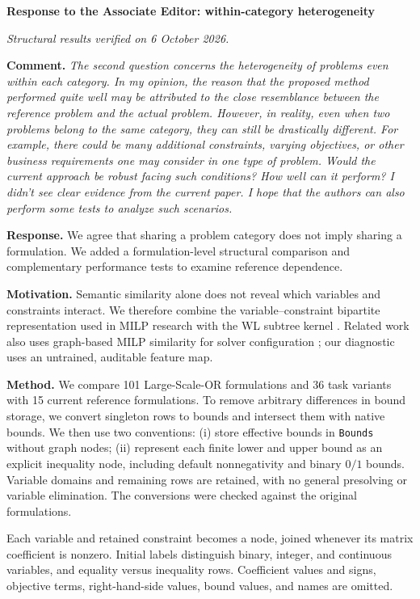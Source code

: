 \documentclass[10pt]{article}
\begin{document}
\textbf{\large Response to the Associate Editor: within-category heterogeneity}

\textit{Structural results verified on 6 October 2026.}

\textbf{Comment.} \textit{The second question concerns the heterogeneity of
problems even within each category. In my opinion, the reason that the
proposed method performed quite well may be attributed to the close
resemblance between the reference problem and the actual problem. However,
in reality, even when two problems belong to the same category, they can
still be drastically different. For example, there could be many additional
constraints, varying objectives, or other business requirements one may
consider in one type of problem. Would the current approach be robust
facing such conditions? How well can it perform? I didn't see clear evidence
from the current paper. I hope that the authors can also perform some tests
to analyze such scenarios.}

\begingroup\color{replyblue}
\textbf{Response.} We agree that sharing a problem category does not imply
sharing a formulation. We added a formulation-level structural comparison
and complementary performance tests to examine reference dependence.

\medskip
\textbf{Motivation.}
Semantic similarity alone does not reveal which variables and constraints
interact. We therefore combine the variable--constraint bipartite
representation used in MILP research \citep{Gasse2019} with the WL subtree
kernel \citep{Shervashidze2011}. Related work also uses graph-based MILP
similarity for solver configuration \citep{Hosny2024}; our diagnostic uses
an untrained, auditable feature map.

\medskip
\textbf{Method.}
We compare 101 Large-Scale-OR formulations and 36 task variants with
15 current reference formulations. To remove arbitrary differences in
bound storage, we convert singleton rows to bounds and intersect them
with native bounds. We then use two conventions: (i) store effective
bounds in \texttt{Bounds} without graph nodes; (ii) represent each finite
lower and upper bound as an explicit inequality node, including default
nonnegativity and binary $0/1$ bounds. Variable domains and remaining
rows are retained, with no general presolving or variable elimination.
The conversions were checked against the original formulations.

Each variable and retained constraint becomes a node, joined whenever
its matrix coefficient is nonzero. Initial labels distinguish binary,
integer, and continuous variables, and equality versus inequality rows.
Coefficient values and signs, objective terms, right-hand-side values,
bound values, and names are omitted.
\end{document}
